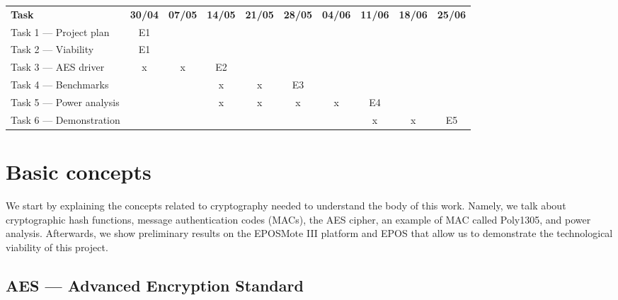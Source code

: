 \documentclass{../sftex/sftex}
\begin{document}
\begin{table}[htbp]
  \centering
  \begin{tabular}{lccccccccc}
    \textbf{Task}           & \textbf{30/04} & \textbf{07/05} & \textbf{14/05}
        & \textbf{21/05} & \textbf{28/05} & \textbf{04/06}
        & \textbf{11/06} & \textbf{18/06} & \textbf{25/06} \\
    Task 1 --- Project plan   & E1             &                &
        &                &                &
        &                &                &                \\
    Task 2 --- Viability      & E1             &                &
        &                &                &
        &                &                &                \\
    Task 3 --- AES driver     & x              & x              & E2
        &                &                &
        &                &                &                \\
    Task 4 --- Benchmarks     &                &                & x
        & x              & E3             &
        &                &                &                \\
    Task 5 --- Power analysis &                &                & x
        & x              & x              & x
        & E4             &                &                \\
    Task 6 --- Demonstration  &                &                &
        &                &                &
        & x              & x              & E5             \\
  \end{tabular}
\end{table}

\section{Basic concepts}

We start by explaining the concepts related to cryptography needed to
understand the body of this work. Namely, we talk about cryptographic hash
functions, message authentication codes (MACs), the AES cipher, an example of
MAC called Poly1305, and power analysis. Afterwards, we show preliminary
results on the EPOSMote III platform and EPOS that allow us to demonstrate the
technological viability of this project.

\subsection{AES --- Advanced Encryption Standard}
\end{document}

